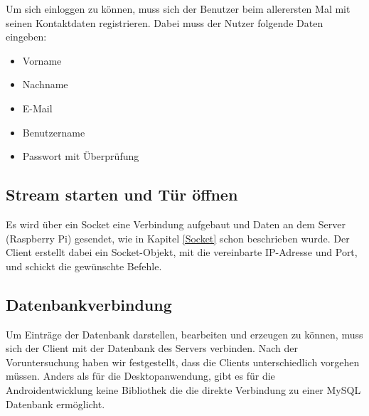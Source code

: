 Um sich einloggen zu können, muss sich der Benutzer beim allerersten Mal mit seinen Kontaktdaten registrieren. Dabei muss der Nutzer folgende Daten eingeben:

\begin{itemize}
	\item {Vorname}
	\item {Nachname}
	\item{E-Mail}
	\item{Benutzername}
	\item{Passwort mit Überprüfung}
\end{itemize}


\subsection{Stream starten und Tür öffnen}
Es wird über ein Socket eine Verbindung aufgebaut und Daten an dem Server (Raspberry Pi) gesendet, wie in Kapitel \ref{Socket} schon beschrieben wurde. Der Client erstellt dabei ein Socket-Objekt, mit die vereinbarte IP-Adresse und Port, und schickt die gewünschte Befehle.

\subsection{Datenbankverbindung}
Um Einträge der Datenbank darstellen, bearbeiten und erzeugen zu können, muss sich der Client mit der Datenbank des Servers verbinden. Nach der Voruntersuchung haben wir festgestellt, dass die Clients unterschiedlich vorgehen müssen. Anders als für die Desktopanwendung, gibt es für die Androidentwicklung keine Bibliothek die die direkte Verbindung zu einer MySQL Datenbank ermöglicht.








